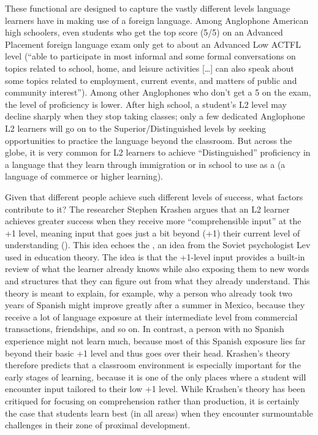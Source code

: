 These functional  are designed to capture
the vastly different levels language learners have in making use of a
foreign language. Among Anglophone American high schoolers, even
students who get the top score (5/5) on an Advanced Placement foreign
language exam only get to about an Advanced Low ACTFL level (``able to
participate in most informal and some formal conversations on topics
related to school, home, and leisure activities [\ldots] can also
speak about some topics related to employment, current events, and
matters of public and community interest'').  Among other Anglophones
who don't get a 5 on the exam, the level of
proficiency is lower.  After high school, a student's L2 level may
decline sharply when they stop taking classes; only a few dedicated
Anglophone L2 learners will go on to the Superior/Distinguished levels
by seeking opportunities to practice the language beyond the
classroom.  But across the globe, it is very common for L2 learners to
achieve ``Distinguished'' proficiency in a language that they learn
through immigration or in school to use as a 
(a language of commerce or higher learning).

Given that different people achieve such different levels of success,
what factors contribute to it?  The researcher Stephen Krashen
\citep{Krashen:1982} argues that an L2 learner achieves greater
success when they receive more ``comprehensible input'' at the
+1 level, meaning input that goes just a bit beyond
(+1) their current level of understanding ().  
This idea echoes the , an idea from the Soviet psychologist Lev \citet{Vygotsky:1978} used in education theory.
The idea is
that the +1-level input provides a built-in review of what
the learner already knows while also exposing them to new words and
structures that they can figure out from what they already understand.
This theory is meant to explain, for example, why a person who already
took two years of Spanish might improve greatly after a summer in
Mexico, because they receive a lot of language exposure at their
intermediate  level from commercial transactions,
friendships, and so on.  In contrast, a person with no Spanish
experience might not learn much, because most of this Spanish exposure
lies far beyond their basic +1 level and thus goes over
their head.  Krashen's theory therefore predicts that a classroom
environment is especially important for the early stages of learning,
because it is one of the only places where a student will encounter
input tailored to their low +1 level.  While Krashen's
theory has been critiqued for focusing on comprehension rather than
production, it is certainly the case that students learn best (in all
areas) when they encounter surmountable challenges in their zone of
proximal development.

